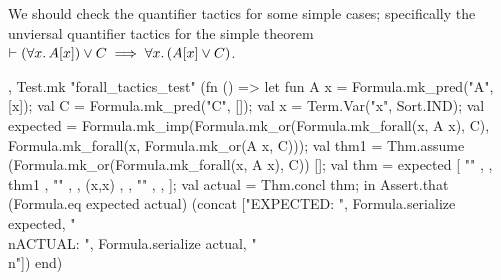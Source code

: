 \begin{node}
We should check the quantifier tactics for some simple cases;
specifically the unviersal quantifier tactics for the simple theorem
$\vdash(\forall x\ldotp A[x])\lor C\implies\forall x\ldotp(A[x]\lor C)$.
\end{node}

\nwenddocs{}\plusendmoddef\nwstartdeflinemarkup{}\nwenddeflinemarkup
, Test.mk "forall_tactics_test" (fn () =>
    let
      fun A x = Formula.mk_pred("A", [x]);
      val C = Formula.mk_pred("C", []);
      val x = Term.Var("x", Sort.IND);
      val expected = Formula.mk_imp(Formula.mk_or(Formula.mk_forall(x, A x),
                                                  C),
                                    Formula.mk_forall(x, Formula.mk_or(A x,
                                                                       C)));
      val thm1 = Thm.assume (Formula.mk_or(Formula.mk_forall(x, A x), C)) [];
      val thm =  expected
                             [  ""
                             , 
                             ,  thm1
                             ,  ""
                             , 
                             ,  (x,x)
                             , 
                             ,  ""
                             , 
                             ,  ];
      val actual = Thm.concl thm;
    in
      Assert.that (Formula.eq expected actual)
                  (concat ["EXPECTED: ",
                           Formula.serialize expected,
                           "\\nACTUAL: ",
                           Formula.serialize actual,
                           "\\n"])
    end)
